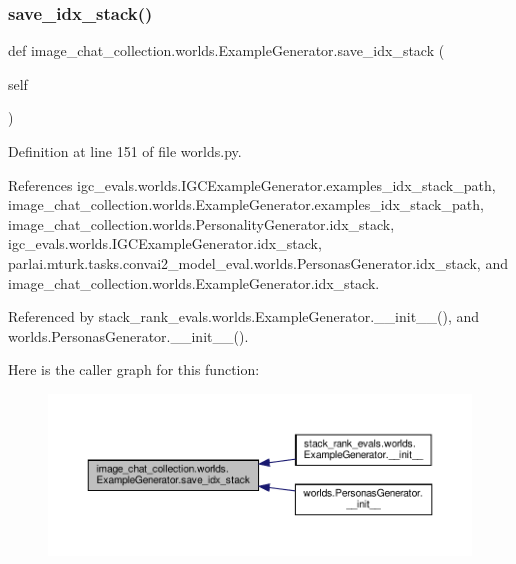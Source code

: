 \mbox{\label{classimage__chat__collection_1_1worlds_1_1ExampleGenerator_ad50213021a72919682cbca2a274d0c4c}} 
\subsubsection{\texorpdfstring{save\+\_\+idx\+\_\+stack()}{save\_idx\_stack()}}
{\footnotesize\ttfamily def image\+\_\+chat\+\_\+collection.\+worlds.\+Example\+Generator.\+save\+\_\+idx\+\_\+stack (\begin{DoxyParamCaption}\item[{}]{self }\end{DoxyParamCaption})}



Definition at line 151 of file worlds.\+py.



References igc\+\_\+evals.\+worlds.\+I\+G\+C\+Example\+Generator.\+examples\+\_\+idx\+\_\+stack\+\_\+path, image\+\_\+chat\+\_\+collection.\+worlds.\+Example\+Generator.\+examples\+\_\+idx\+\_\+stack\+\_\+path, image\+\_\+chat\+\_\+collection.\+worlds.\+Personality\+Generator.\+idx\+\_\+stack, igc\+\_\+evals.\+worlds.\+I\+G\+C\+Example\+Generator.\+idx\+\_\+stack, parlai.\+mturk.\+tasks.\+convai2\+\_\+model\+\_\+eval.\+worlds.\+Personas\+Generator.\+idx\+\_\+stack, and image\+\_\+chat\+\_\+collection.\+worlds.\+Example\+Generator.\+idx\+\_\+stack.



Referenced by stack\+\_\+rank\+\_\+evals.\+worlds.\+Example\+Generator.\+\_\+\+\_\+init\+\_\+\+\_\+(), and worlds.\+Personas\+Generator.\+\_\+\+\_\+init\+\_\+\+\_\+().

Here is the caller graph for this function\+:
\nopagebreak
\begin{figure}[H]
\begin{center}
\leavevmode
\includegraphics[width=350pt]{classimage__chat__collection_1_1worlds_1_1ExampleGenerator_ad50213021a72919682cbca2a274d0c4c_icgraph}
\end{center}
\end{figure}



